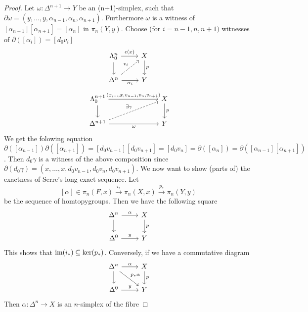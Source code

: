 \begin{proof}
    Let $\omega \colon \Delta^{n+1} \to Y$ be an (n+1)-simplex, such that
    $\partial \omega = ( y, \dotsc , y , \alpha_{n-1}, \alpha_n , \alpha_{n+1})$. Furthermore $\omega$ is a witness of $[\alpha_{n-1}][\alpha_{n+1}]=[\alpha_n]$ in $\pi_n(Y,y)$.
    Choose (for $i=n-1,n,n+1)$ witnesses of $\partial([\alpha_i])=[d_0v_i]$
    \[
    \begin{tikzcd}
        \Lambda_0^n
        \ar[r, "c(x)"]
        \ar[d]
        &
        X
        \ar[d, "p"]
        \\
        \Delta^n
        \ar[ru, dashed, "v_i"]
        \ar[r, "\alpha_i"']
        &
        Y
    \end{tikzcd}
    \]
    \[
    \begin{tikzcd}
        \Lambda^{n+1}_0
        \ar[rrr, "{(x,\dotsc,x, v_{n-1},v_n,v_{n+1})}"]
        \dar
        &&&
        X
        \dar["p"]
        \\
        \Delta^{n+1}
        \ar[rrru, dashed, "\exists \gamma"]
        \ar[rrr, "\omega"']
        &&&
        Y
    \end{tikzcd}
    \]
    We get the folowing equation $\partial([\alpha_{n-1}]) \partial([\alpha_{n+1}])=[d_0v_{n-1}][d_0v_{n+1}]=[d_0v_n]=\partial([\alpha_n])=\partial([\alpha_{n-1}][\alpha_{n+1}])$.
    Then $d_0\gamma$ is a witness of the above composition since $\partial(d_0\gamma)=(x,\dotsc,x, d_0v_{n-1}, d_0v_n, d_0v_{n+1})$.
    We now want to show (parts of) the exactness of Serre's long exact sequence.
    Let
    \[
        [\alpha] \in \pi_n(F,x) \xrightarrow{i_*} \pi_n(X,x) \xrightarrow{p_*}
        \pi_n(Y,y)
    \]
    be the sequence of homtopygroups.
    Then we have the following square
    \[
    \begin{tikzcd}
        \Delta^n
        \ar[r, "\alpha"]
        \ar[d]
        &
        X
        \ar[d, "p"]
        \\
        \Delta^0
        \ar[r,"y"]
        &
        Y
    \end{tikzcd}
    \]
    This shows that $ \operatorname{im}(i_*) \subseteq \ker(p_*)$.
    Conversely, if we have a commutative diagram
    \[
    \begin{tikzcd}
        \Delta^n
        \ar[r, "\alpha"]
        \ar[d]
        \ar[rd, "p_*\alpha"]
        &
        X
        \ar[d, "p"]
        \\
        \Delta^0
        \ar[r,"y"]
        &
        Y
    \end{tikzcd}
    \]
    Then $\alpha \colon \Delta^n \to  X$ is an $n$-simplex of the fibre

\end{proof}
